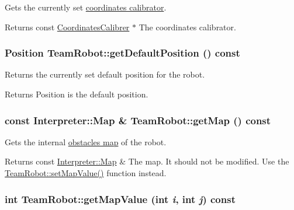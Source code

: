 Gets the currently set \hyperlink{classCoordinatesCalibrer}{coordinates calibrator}. 

\begin{DoxyReturn}{Returns}
const \hyperlink{classCoordinatesCalibrer}{CoordinatesCalibrer} $\ast$ The coordinates calibrator. 
\end{DoxyReturn}
\hypertarget{classTeamRobot_acd11ff6d9651a8deddafa5bd9a30865c}{
\subsubsection[{getDefaultPosition}]{\setlength{\rightskip}{0pt plus 5cm}Position TeamRobot::getDefaultPosition () const}}
\label{classTeamRobot_acd11ff6d9651a8deddafa5bd9a30865c}


Returns the currently set default position for the robot. 

\begin{DoxyReturn}{Returns}
Position is the default position. 
\end{DoxyReturn}
\hypertarget{classTeamRobot_a8b5fa0d9f42166fc3339ec901fad5a91}{
\subsubsection[{getMap}]{\setlength{\rightskip}{0pt plus 5cm}const {\bf Interpreter::Map} \& TeamRobot::getMap () const}}
\label{classTeamRobot_a8b5fa0d9f42166fc3339ec901fad5a91}


Gets the internal \hyperlink{classInterpreter_a4c080f069f557cf92dfe803117a6ea53}{obstacles map} of the robot. 

\begin{DoxyReturn}{Returns}
const \hyperlink{classInterpreter_a4c080f069f557cf92dfe803117a6ea53}{Interpreter::Map} \& The map. It should not be modified. Use the \hyperlink{classTeamRobot_a28ee2460e7d465989bb0582782db851e}{TeamRobot::setMapValue()} function instead. 
\end{DoxyReturn}
\hypertarget{classTeamRobot_abc3a5d2d4cac44629a9d8851164b5eda}{
\subsubsection[{getMapValue}]{\setlength{\rightskip}{0pt plus 5cm}int TeamRobot::getMapValue (int {\em i}, \/  int {\em j}) const}}
\label{classTeamRobot_abc3a5d2d4cac44629a9d8851164b5eda}


